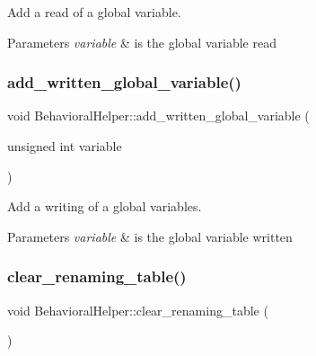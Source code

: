 Add a read of a global variable. 


\begin{DoxyParams}{Parameters}
{\em variable} & is the global variable read \\
\hline
\end{DoxyParams}
\mbox{\label{classBehavioralHelper_abcd96c178eb6529dd83d5b1b60a1f1cb}} 
\subsubsection{\texorpdfstring{add\+\_\+written\+\_\+global\+\_\+variable()}{add\_written\_global\_variable()}}
{\footnotesize\ttfamily void Behavioral\+Helper\+::add\+\_\+written\+\_\+global\+\_\+variable (\begin{DoxyParamCaption}\item[{unsigned int}]{variable }\end{DoxyParamCaption})}



Add a writing of a global variables. 


\begin{DoxyParams}{Parameters}
{\em variable} & is the global variable written \\
\hline
\end{DoxyParams}
\mbox{\label{classBehavioralHelper_a18f5452ae64b9e359fe631cf34740f08}} 
\subsubsection{\texorpdfstring{clear\+\_\+renaming\+\_\+table()}{clear\_renaming\_table()}}
{\footnotesize\ttfamily void Behavioral\+Helper\+::clear\+\_\+renaming\+\_\+table (\begin{DoxyParamCaption}{ }\end{DoxyParamCaption})\hspace{0.3cm}{\ttfamily [static]}}



